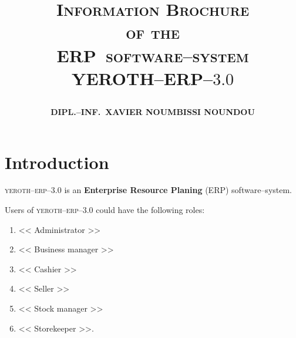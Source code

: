 \documentclass[a4paper, 10pt, twocolumn]{article}
\newcommand{\pos}{ERP~software--system\xspace}
\newcommand{\yerenpos}{\textcolor{yerenColorBlue}{\sc YEROTH--ERP--$3.0$}\xspace}
\newcommand{\myfullacademicname}{DIPL.--INF.~XAVIER NOUMBISSI NOUNDOU\xspace}
\newcommand{\yeren}{\textsc{yeroth--erp--3.0}\xspace}
\newcommand{\administrator}{<< Administrator >>\xspace}
\newcommand{\manager}{<< Business manager >>\xspace}
\newcommand{\seller}{<< Seller >>\xspace}
\newcommand{\inventorystockmanager}{<< Stock manager >>\xspace}
\newcommand{\storekeeper}{<< Storekeeper >>\xspace}
\newcommand{\cashier}{<< Cashier >>\xspace}
\begin{document}
\title{\textcolor{medgreen}{
\vspace{0em}
\textsc{\textbf{Information Brochure \\
of the \\
\pos \\ \vspace{1em}
\yerenpos}}}
\author{\textbf{\myfullacademicname}}
}

\date{} 
\maketitle
\thispagestyle{fancy}



\vspace{-1em}

\section{Introduction}

\yeren is an \textbf{Enterprise Resource Planing} (ERP)
software--system. 

Users of \yeren could have the following roles:
\begin{enumerate}[1)]
	\itemsep -0.6em
	\item \administrator
	\item \manager
	\item \cashier
	\item \seller
	\item \inventorystockmanager
	\item \storekeeper.	
\end{enumerate}
\end{document}
